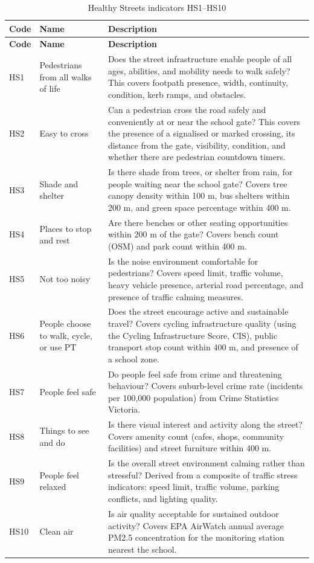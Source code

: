 \documentclass[11pt,a4paper,openany]{book}
\begin{document}
\begin{longtable}{C{1.2cm}L{3.5cm}L{8cm}}
\caption{Healthy Streets indicators HS1--HS10}\label{tab:hs_indicators}\\
\toprule
\textbf{Code} & \textbf{Name} & \textbf{Description} \\
\midrule
\endfirsthead
\toprule
\textbf{Code} & \textbf{Name} & \textbf{Description} \\
\midrule
\endhead
\bottomrule
\endfoot
HS1 & Pedestrians from all walks of life &
  Does the street infrastructure enable people of all ages, abilities, and mobility needs to walk safely? This covers footpath presence, width, continuity, condition, kerb ramps, and obstacles. \\[4pt]
HS2 & Easy to cross &
  Can a pedestrian cross the road safely and conveniently at or near the school gate? This covers the presence of a signalised or marked crossing, its distance from the gate, visibility, condition, and whether there are pedestrian countdown timers. \\[4pt]
HS3 & Shade and shelter &
  Is there shade from trees, or shelter from rain, for people waiting near the school gate? Covers tree canopy density within 100 m, bus shelters within 200 m, and green space percentage within 400 m. \\[4pt]
HS4 & Places to stop and rest &
  Are there benches or other seating opportunities within 200 m of the gate? Covers bench count (OSM) and park count within 400 m. \\[4pt]
HS5 & Not too noisy &
  Is the noise environment comfortable for pedestrians? Covers speed limit, traffic volume, heavy vehicle presence, arterial road percentage, and presence of traffic calming measures. \\[4pt]
HS6 & People choose to walk, cycle, or use PT &
  Does the street encourage active and sustainable travel? Covers cycling infrastructure quality (using the Cycling Infrastructure Score, CIS), public transport stop count within 400 m, and presence of a school zone. \\[4pt]
HS7 & People feel safe &
  Do people feel safe from crime and threatening behaviour? Covers suburb-level crime rate (incidents per 100,000 population) from Crime Statistics Victoria. \\[4pt]
HS8 & Things to see and do &
  Is there visual interest and activity along the street? Covers amenity count (cafes, shops, community facilities) and street furniture within 400 m. \\[4pt]
HS9 & People feel relaxed &
  Is the overall street environment calming rather than stressful? Derived from a composite of traffic stress indicators: speed limit, traffic volume, parking conflicts, and lighting quality. \\[4pt]
HS10 & Clean air &
  Is air quality acceptable for sustained outdoor activity? Covers EPA AirWatch annual average PM2.5 concentration for the monitoring station nearest the school. \\
\end{longtable}
\end{document}
